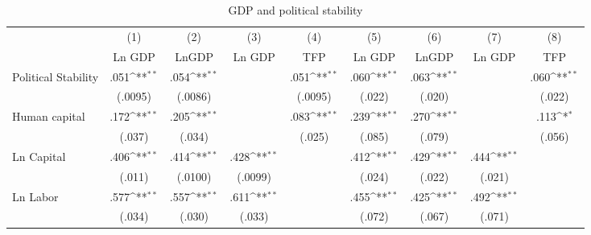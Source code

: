 \begin{table} \footnotesize \begin{threeparttable} \caption{GDP and political stability}         \label{table:gdp} \centering    {}         \begin{tabular}{l*{8}{c}} \toprule \toprule
                    &\multicolumn{1}{c}{(1)}        &\multicolumn{1}{c}{(2)}        &\multicolumn{1}{c}{(3)}        &\multicolumn{1}{c}{(4)}        &\multicolumn{1}{c}{(5)}        &\multicolumn{1}{c}{(6)}        &\multicolumn{1}{c}{(7)}        &\multicolumn{1}{c}{(8)}        \\
                    &      Ln GDP        &       LnGDP        &      Ln GDP        &         TFP        &      Ln GDP        &       LnGDP        &      Ln GDP        &         TFP        \\
\midrule 
Political Stability &        .051\sym{**}&        .054\sym{**}&                    &        .051\sym{**}&        .060\sym{**}&        .063\sym{**}&                    &        .060\sym{**}\\
                    &     (.0095)        &     (.0086)        &                    &     (.0095)        &      (.022)        &      (.020)        &                    &      (.022)        \\
Human capital       &        .172\sym{**}&        .205\sym{**}&                    &        .083\sym{**}&        .239\sym{**}&        .270\sym{**}&                    &        .113\sym{*} \\
                    &      (.037)        &      (.034)        &                    &      (.025)        &      (.085)        &      (.079)        &                    &      (.056)        \\
Ln Capital          &        .406\sym{**}&        .414\sym{**}&        .428\sym{**}&                    &        .412\sym{**}&        .429\sym{**}&        .444\sym{**}&                    \\
                    &      (.011)        &     (.0100)        &     (.0099)        &                    &      (.024)        &      (.022)        &      (.021)        &                    \\
Ln Labor            &        .577\sym{**}&        .557\sym{**}&        .611\sym{**}&                    &        .455\sym{**}&        .425\sym{**}&        .492\sym{**}&                    \\
                    &      (.034)        &      (.030)        &      (.033)        &                    &      (.072)        &      (.067)        &      (.071)        &                    \\

\end{tabular}
\end{threeparttable}
\end{table}
